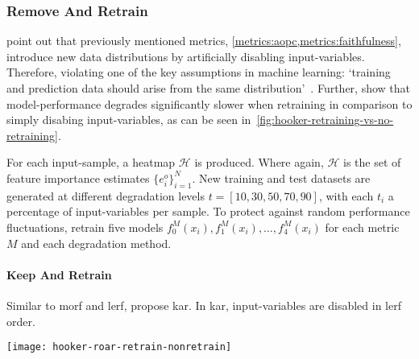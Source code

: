 \subsubsection{Remove And Retrain}\label{metrics:roar}
\citeauthor{Hooker.2019} point out that previously mentioned metrics, \cref{metrics:aopc,metrics:faithfulness}, introduce new data distributions by artificially disabling input-variables. Therefore, violating one of the key assumptions in machine learning: `training and prediction data should arise from the same distribution'~\cite{McGaughey.2016}. Further, \citeauthor{Hooker.2019} show that model-performance degrades significantly slower when retraining in comparison to simply disabing input-variables, as can be seen in~\cref{fig:hooker-retraining-vs-no-retraining}.
\par
For each input-sample, a heatmap \(\mathscr H\) is produced. Where again,
\(\mathscr H\) is the set of feature importance estimates \( \{ e^{o}_{i} \}^N_{i=1} \). New training and test datasets are generated at different degradation levels \(t=\left[10, 30, 50, 70, 90 \right]\), with each \(t_i\) a percentage of input-variables per sample. To protect against random performance fluctuations, \citeauthor{Hooker.2019} retrain five models \(f_0^M(x_i), f_1^M(x_i),\ldots, f_4^M(x_i)\) for each metric \(M\) and each degradation method.

\paragraph{Keep And Retrain}
Similar to \gls{morf} and \gls{lerf}, \citeauthor{Hooker.2019} propose \gls{kar}. In \gls{kar}, input-variables are disabled in \gls{lerf} order.
\begin{figure*}[ht]
    \center{}
    \texttt{[image: hooker-roar-retrain-nonretrain]}
    \caption[The effect of retraining on model degredation in metrics.]{The figure shows the drastic decrease in model accuracy when disabling input-variables without retraining, but significantly smoothened when retraining is undertaken. Evaluated over Guided Backprop (GP), the unweighted gradient (GRAD), Integrated Gradients (IG) and random baseline.
    \textbf{Left:} evaluation of \gls{roar} without retraining. \textbf{Right:} evaluation of \gls{roar} with retraining. Adopted from~\cite{Hooker.2019}}\label{fig:hooker-retraining-vs-no-retraining}
\end{figure*}
